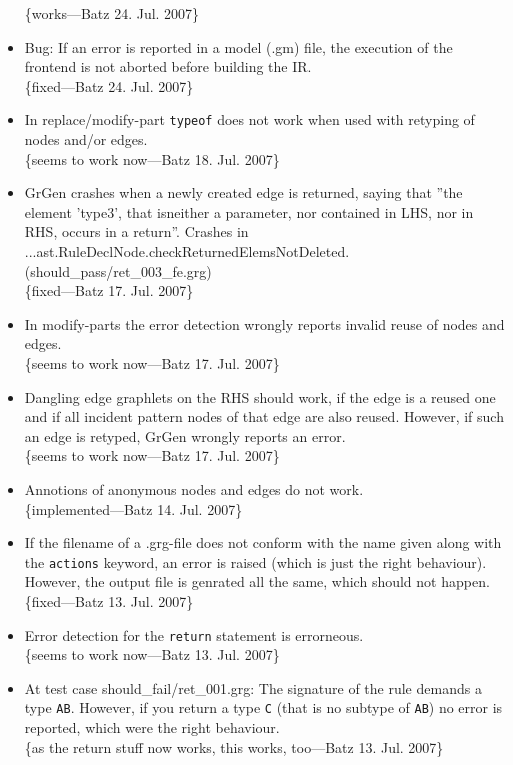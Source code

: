 \documentclass[12pt,a4paper]{article}
\begin{document}
\begin{itemize}
		\{works---Batz 24. Jul. 2007\}
	\item Bug: If an error is reported in a model (.gm) file, the execution of the frontend is not aborted before building the IR.\\
		\{fixed---Batz 24. Jul. 2007\}
	\item In replace/modify-part {\tt typeof} does not work when used with retyping of nodes and/or edges.\\
		\{seems to work now---Batz 18. Jul. 2007\}
    \item GrGen crashes when a newly created edge is returned, saying that ''the element 'type3', that isneither a parameter, nor contained in LHS, nor in RHS, occurs in a return''.
		Crashes in\\
		...ast.RuleDeclNode.checkReturnedElemsNotDeleted.\\
		(should\_pass/ret\_003\_fe.grg)\\
		\{fixed---Batz 17. Jul. 2007\}
	\item In modify-parts the error detection wrongly reports invalid reuse of nodes and edges.\\
		\{seems to work now---Batz 17. Jul. 2007\}
	\item Dangling edge graphlets on the RHS should work, if the edge is a reused one and if all incident pattern nodes of that edge are also reused.
    However, if such an edge is retyped, GrGen wrongly reports an error.\\
		\{seems to work now---Batz 17. Jul. 2007\}
	\item Annotions of anonymous nodes and edges do not work.\\
		\{implemented---Batz 14. Jul. 2007\}
	\item If the filename of a .grg-file does not conform with the name given along with the {\tt actions} keyword, an error is raised (which is just the right behaviour). However, the output file is genrated all the same, which should not happen.\\
    \{fixed---Batz 13. Jul. 2007\}
	\item Error detection for the {\tt return} statement is errorneous.\\
		\{seems to work now---Batz 13. Jul. 2007\}
	\item At test case should\_fail/ret\_001.grg:
  	The signature of the rule demands a type {\tt AB}.
	However, if you return a type {\tt C} (that is no subtype of {\tt AB}) no error is reported, which were the right behaviour.\\
		\{as the return stuff now works, this works, too---Batz 13. Jul. 2007\}
\end{itemize}
\end{document}
